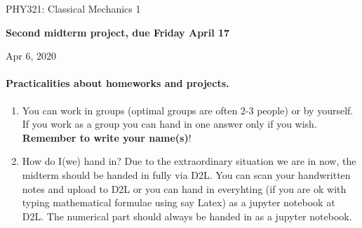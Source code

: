 \documentclass[%
oneside,                 %
final,                   %
10pt]{article}
\begin{document}

\newcommand{\exercisesection}[1]{\subsection*{#1}}






\thispagestyle{empty}

\begin{center}
{\LARGE\bf
\begin{spacing}{1.25}
PHY321: Classical Mechanics 1
\end{spacing}
}
\end{center}


\begin{center}
{\bf Second midterm project, due Friday April 17${}^{}$} \\ [0mm]
\end{center}

\begin{center}
\end{center}
    

\begin{center}
Apr 6, 2020
\end{center}

\vspace{1cm}


\paragraph{Practicalities about  homeworks and projects.}
\begin{enumerate}
\item You can work in groups (optimal groups are often 2-3 people) or by yourself. If you work as a group you can hand in one answer only if you wish. \textbf{Remember to write your name(s)}!

\item How do I(we)  hand in?  Due to the extraordinary situation we are in now, the midterm should be handed in fully via D2L. You can scan your handwritten notes and upload to D2L or you can hand in everyhting (if you are ok with typing mathematical formulae using say Latex) as a jupyter notebook at D2L. The numerical part should always be handed in as a jupyter notebook.
\end{enumerate}
\end{document}
